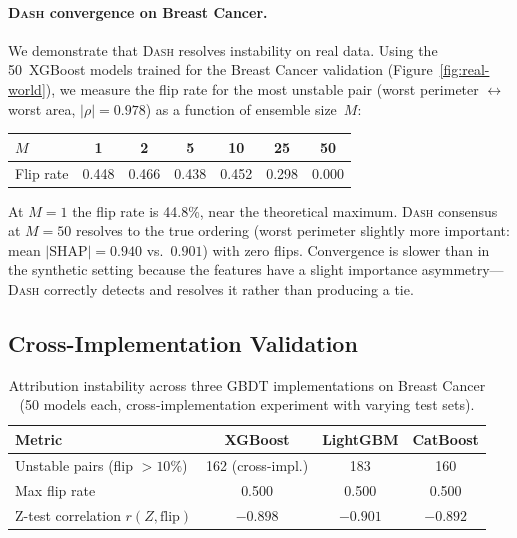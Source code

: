 \documentclass{article}
\newcommand{\SHAP}{\mathrm{SHAP}}
\newcommand{\DASH}{\textsc{Dash}}
\begin{document}
\paragraph{\DASH{} convergence on Breast Cancer.}
We demonstrate that \DASH{} resolves instability on real data.
Using the 50~XGBoost models trained for the Breast Cancer validation
(Figure~\ref{fig:real-world}), we measure the flip rate for the most
unstable pair (worst perimeter $\leftrightarrow$ worst area,
$|\rho|{=}0.978$) as a function of ensemble size~$M$:

\begin{center}
\small
\begin{tabular}{@{}lcccccc@{}}
\toprule
$M$ & 1 & 2 & 5 & 10 & 25 & 50 \\
\midrule
Flip rate & 0.448 & 0.466 & 0.438 & 0.452 & 0.298 & 0.000 \\
\bottomrule
\end{tabular}
\end{center}

At $M{=}1$ the flip rate is 44.8\%, near the theoretical maximum. \DASH{} consensus at $M{=}50$ resolves to the true ordering (worst perimeter slightly more important: mean $|\SHAP| = 0.940$ vs.\ $0.901$) with zero flips. Convergence is slower than in the synthetic setting because the features have a slight importance asymmetry---\DASH{} correctly detects and resolves it rather than producing a tie.

\subsection{Cross-Implementation Validation}

\begin{table}[t]
\centering
\caption{Attribution instability across three GBDT implementations on Breast Cancer (50 models each, cross-implementation experiment with varying test sets).}
\label{tab:cross-impl}
\small
\begin{tabular}{@{}lccc@{}}
\toprule
Metric & XGBoost & LightGBM & CatBoost \\
\midrule
Unstable pairs (flip $> 10\%$) & 162 (cross-impl.) & 183 & 160 \\
Max flip rate & 0.500 & 0.500 & 0.500 \\
Z-test correlation $r(Z, \text{flip})$ & $-0.898$ & $-0.901$ & $-0.892$ \\
\bottomrule
\end{tabular}
\end{table}
\end{document}
